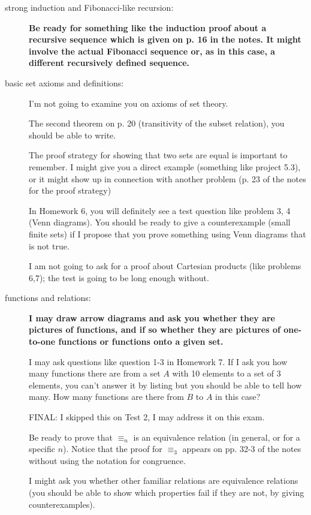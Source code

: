 \documentclass[12pt]{article}
\begin{document}
\begin{description}

\item[strong induction and Fibonacci-like recursion:]  {\bf Be ready for something like the induction proof about a recursive sequence which is given on p. 16 in the notes.  It might involve the actual Fibonacci sequence or, as in this case, a different recursively defined sequence.}

\item[basic set axioms and definitions:]  I'm not going to examine you on axioms of set theory.

The second theorem on p. 20 (transitivity of the subset relation), you should be able to write.

The proof strategy for showing that two sets are equal is important to remember.  I might give you a direct example (something like project 5.3), or it might show up in connection with another problem (p. 23 of the notes for the proof strategy)

In Homework 6, you will definitely see a test question like problem 3, 4 (Venn diagrams).  You should be ready to give a counterexample (small finite sets) if I propose that you prove something using Venn diagrams that is not true.

I am not going to ask for a proof about Cartesian products (like problems 6,7);  the test is going to be long enough without.

\item[functions and relations:]

{\bf I may draw arrow diagrams and ask you whether they are pictures of functions, and if so whether they are pictures of one-to-one functions or functions onto a given set.

I may ask questions like question 1-3 in Homework 7.  If I ask you how many functions there are from a set $A$ with 10 elements to a set of 3 elements, you can't answer it by listing but you should be able to tell how many.  How many functions are there from $B$ to $A$ in this case?}  FINAL:  I skipped this on Test 2, I may address it on this exam.

Be ready to prove that $\equiv_n$ is an equivalence relation (in general, or for a specific $n$).  Notice that the proof for $\equiv_3$ appears on pp. 32-3 of the notes without using the notation for congruence.

I might ask you whether other familiar relations are equivalence relations (you should be able to show which properties fail if they are not, by giving counterexamples).


\end{description}
\end{document}
